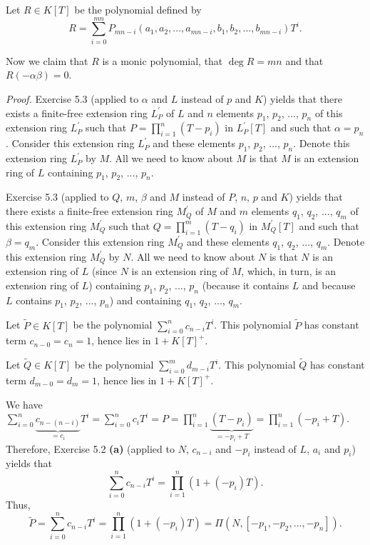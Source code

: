 \documentclass[numbers=enddot,12pt,final,onecolumn,notitlepage]{scrartcl}%
\begin{document}
Let $R\in K\left[  T\right]  $ be the polynomial defined by%
\[
R=\sum\limits_{i=0}^{mn}P_{mn-i}\left(  a_{1},a_{2},...,a_{mn-i},b_{1}%
,b_{2},...,b_{mn-i}\right)  T^{i}.
\]


Now we claim that $R$ is a monic polynomial, that $\deg R=mn$ and that
$R\left(  -\alpha\beta\right)  =0$.

\textit{Proof.} Exercise 5.3 (applied to $\alpha$ and $L$ instead of $p$ and
$K$) yields that there exists a finite-free extension ring $L_{P}^{\prime}$ of
$L$ and $n$ elements $p_{1}$, $p_{2}$, $...$, $p_{n}$ of this extension ring
$L_{P}^{\prime}$ such that $P=\prod\limits_{i=1}^{n}\left(  T-p_{i}\right)  $
in $L_{P}^{\prime}\left[  T\right]  $ and such that $\alpha=p_{n}$. Consider
this extension ring $L_{P}^{\prime}$ and these elements $p_{1}$, $p_{2}$,
$...$, $p_{n}$. Denote this extension ring $L_{P}^{\prime}$ by $M$. All we
need to know about $M$ is that $M$ is an extension ring of $L$ containing
$p_{1}$, $p_{2}$, $...$, $p_{n}$.

Exercise 5.3 (applied to $Q$, $m$, $\beta$ and $M$ instead of $P$, $n$, $p$
and $K$) yields that there exists a finite-free extension ring $M_{Q}^{\prime
}$ of $M$ and $m$ elements $q_{1}$, $q_{2}$, $...$, $q_{m}$ of this extension
ring $M_{Q}^{\prime}$ such that $Q=\prod\limits_{i=1}^{m}\left(
T-q_{i}\right)  $ in $M_{Q}^{\prime}\left[  T\right]  $ and such that
$\beta=q_{m}$. Consider this extension ring $M_{Q}^{\prime}$ and these
elements $q_{1}$, $q_{2}$, $...$, $q_{m}$. Denote this extension ring
$M_{Q}^{\prime}$ by $N$. All we need to know about $N$ is that $N$ is an
extension ring of $L$ (since $N$ is an extension ring of $M$, which, in turn,
is an extension ring of $L$) containing $p_{1}$, $p_{2}$, $...$, $p_{n}$
(because it contains $L$ and because $L$ contains $p_{1}$, $p_{2}$, $...$,
$p_{n}$) and containing $q_{1}$, $q_{2}$, $...$, $q_{m}$.

Let $\widetilde{P}\in K\left[  T\right]  $ be the polynomial $\sum
\limits_{i=0}^{n}c_{n-i}T^{i}$. This polynomial $\widetilde{P}$ has constant
term $c_{n-0}=c_{n}=1$, hence lies in $1+K\left[  T\right]  ^{+}$.

Let $\widetilde{Q}\in K\left[  T\right]  $ be the polynomial $\sum
\limits_{i=0}^{m}d_{m-i}T^{i}$. This polynomial $\widetilde{Q}$ has constant
term $d_{m-0}=d_{m}=1$, hence lies in $1+K\left[  T\right]  ^{+}$.

We have $\sum\limits_{i=0}^{n}\underbrace{c_{n-\left(  n-i\right)  }}_{=c_{i}%
}T^{i}=\sum\limits_{i=0}^{n}c_{i}T^{i}=P=\prod\limits_{i=1}^{n}%
\underbrace{\left(  T-p_{i}\right)  }_{=-p_{i}+T}=\prod\limits_{i=1}%
^{n}\left(  -p_{i}+T\right)  $. Therefore, Exercise 5.2 \textbf{(a)} (applied
to $N$, $c_{n-i}$ and $-p_{i}$ instead of $L$, $a_{i}$ and $p_{i}$) yields
that%
\[
\sum\limits_{i=0}^{n}c_{n-i}T^{i}=\prod\limits_{i=1}^{n}\left(  1+\left(
-p_{i}\right)  T\right)  .
\]
Thus,%
\[
\widetilde{P}=\sum\limits_{i=0}^{n}c_{n-i}T^{i}=\prod\limits_{i=1}^{n}\left(
1+\left(  -p_{i}\right)  T\right)  =\Pi\left(  N,\left[  -p_{1},-p_{2}%
,...,-p_{n}\right]  \right)  .
\]
\end{document}
